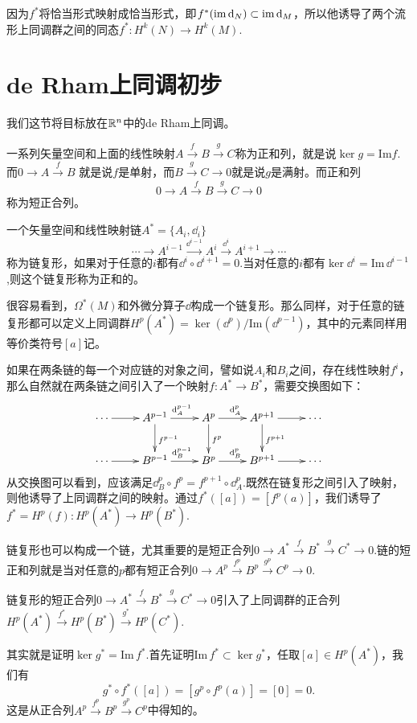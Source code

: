 因为$f^*$将恰当形式映射成恰当形式，即$f^*(\operatorname{im} \mathrm{d}_N)\subset \operatorname{im} \mathrm{d}_M$，所以他诱导了两个流形上同调群之间的同态$f^*:H^k(N)\to H^k(M)$.

\section{de Rham上同调初步}

我们这节将目标放在$\mathbb{R}^n$中的de Rham上同调。

\para 一系列矢量空间和上面的线性映射$A\xrightarrow{f}B\xrightarrow{g}C$称为正和列，就是说$\ker g=\mathrm{Im} f$.而$0\to A\xrightarrow{f}B$
就是说$f$是单射，而$B\xrightarrow{g}C\to 0$就是说$g$是满射。而正和列
\[
0\to A\xrightarrow{f}B\xrightarrow{g}C\to 0
\]
称为短正合列。

一个矢量空间和线性映射链$A^*=\{A_i,\dd_i\}$
\[
	\cdots\to A^{i-1}\xrightarrow{\dd^{i-1}}A^i\xrightarrow{\dd^i}A^{i+1}\to \cdots
\]
称为链复形，如果对于任意的$i$都有$\dd^i \circ \dd^{i+1}=0$.当对任意的$i$都有$\ker \dd^i=\mathrm{Im}\, \dd^{i-1}$,则这个链复形称为正和的。

很容易看到，$\Omega^*(M)$和外微分算子$\dd$构成一个链复形。那么同样，对于任意的链复形都可以定义上同调群$H^p(A^*)=\ker (\dd^p)/\mathrm{Im} (\dd^{p-1})$，其中的元素同样用等价类符号$[a]$记。

\para 如果在两条链的每一个对应链的对象之间，譬如说$A_i$和$B_i$之间，存在线性映射$f^i$，那么自然就在两条链之间引入了一个映射$f:A^*\to B^*$，需要交换图如下：
	\[
	\xymatrix{
		\cdots\ar[r]&A^{p-1}\ar[r]^{\dd_A^{p-1}}\ar[d]^{f^{p-1}}&A^p\ar[r]^{\dd_A^p}\ar[d]^{f^{p}}&A^{p+1}\ar[r]\ar[d]^{f^{p+1}}&\cdots\\
		\cdots\ar[r]&B^{p-1}\ar[r]^{\dd_B^{p-1}}&B^p\ar[r]^{\dd_B^p}&B^{p+1}\ar[r]&\cdots
	}
	\]
从交换图可以看到，应该满足$\dd^{p}_B\circ f^p=f^{p+1}\circ \dd^{p}_A$.既然在链复形之间引入了映射，则他诱导了上同调群之间的映射。通过$f^*([a])=[f^p(a)]$，我们诱导了$f^*=H^p(f):H^p(A^*)\to H^p(B^*)$.

\para 链复形也可以构成一个链，尤其重要的是短正合列$0\to A^*\xrightarrow{f}B^*\xrightarrow{g}C^*\to 0$.链的短正和列就是当对任意的$p$都有短正合列$0\to A^p\xrightarrow{f^p}B^p\xrightarrow{g^p}C^p\to 0$.

\pro 链复形的短正合列$0\to A^*\xrightarrow{f}B^*\xrightarrow{g}C^*\to 0$引入了上同调群的正合列$H^p(A^*)\xrightarrow{f^*}H^p(B^*)\xrightarrow{g^*}H^p(C^*)$.

\proof 其实就是证明$\ker g^*=\mathrm{Im}\, f^*$.首先证明$\mathrm{Im}\, f^* \subset \ker g^*$，任取$[a]\in H^p(A^*)$，我们有
\[
g^*\circ f^*([a])=[g^p\circ f^p(a)]=[0]=0.
\]
这是从正合列$A^p\xrightarrow{f^p}B^p\xrightarrow{g^p}C^p$中得知的。

